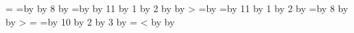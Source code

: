 {{{  \fi
 \fi
 \let\QRSchemaB=\futQRSchemaB\futF\futC
 \QRnumD=\QRinfty
\else %
 \QRnumG=\QRnumA\advance\QRnumG by \QRnumC\multiply\QRnumG by 8 \advance\QRnumG by \QRnumF\edef\exprB{\the\QRnumG\QRspace}%
 \QRnumG=\QRnumA\advance\QRnumG by \QRnumB\multiply\QRnumG by 11 \advance\QRnumG by 1 \divide\QRnumG by 2 \advance\QRnumG by \QRnumE\edef\exprA{\the\QRnumG\QRspace}%
 \advance\QRnumG by \QRBswitchCost
 \ifnum\exprB>\QRnumG
  \edef\futF{\QRnumF=\the\QRnumG\QRspace}\QRnumG=\QRnumB\advance\QRnumG by \QRnumA
  \edef\futQRSchemaB{\QRSchemaA A\the\QRnumG}\def\futC{\QRnumC=0 }%
 \else
  \let\futF=\relax\def\futC{\advance\QRnumC by \QRnumA}\let\futQRSchemaB=\QRSchemaB
 \fi
 \QRnumG=\QRnumB\multiply\QRnumG by 11 \advance\QRnumG by 1 \divide\QRnumG by 2 \advance\QRnumG by \QRnumE\edef\exprA{\the\QRnumG\QRspace}%
 \QRnumG=\QRnumC\multiply\QRnumG by 8 \advance\QRnumG by \QRnumF\edef\exprB{\the\QRnumG\QRspace}%
 \advance\QRnumG by \QRAswitchCost
 \ifnum\exprA>\QRnumG
  \edef\futE{\QRnumE=\the\QRnumG\QRspace}\def\futB{\QRnumB=\QRnumA}\edef\futQRSchemaA{\QRSchemaB B\the\QRnumC}%
 \else
  \let\futE=\relax\def\futB{\advance\QRnumB by \QRnumA}\let\futQRSchemaA=\QRSchemaA
 \fi
 \QRnumG=\QRnumD
 \QRnumD=\QRnumA\multiply\QRnumD by 10 \advance\QRnumD by 2 \divide\QRnumD by 3 \advance\QRnumD by \QRNswitchCost
 \ifnum\QRnumG=\QRNswitchCost
  \edef\QRSchemaN{N\the\QRnumA}%
 \else
  \ifnum\exprA<\exprB
   \edef\QRSchemaN{\QRSchemaA A\the\QRnumB N\the\QRnumA}\advance\QRnumD by \exprA
  \else
   \edef\QRSchemaN{\QRSchemaB B\the\QRnumC N\the\QRnumA}\advance\QRnumD by \exprB
}}}
